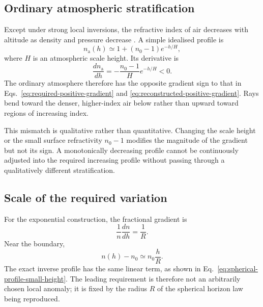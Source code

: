 \subsection{Ordinary atmospheric stratification}

Except under strong local inversions, the refractive index of air decreases
with altitude as density and pressure decrease
\cite{ciddor1996refractive,ussa1976,bean1966radio,itur2019p453}. A simple
idealised profile is
\begin{equation}
    n_{\mathrm{a}}(h)
    \simeq
    1+(n_0-1)e^{-h/H},
    \label{eq:ordinary-atmosphere-profile}
\end{equation}
where $H$ is an atmospheric scale height. Its derivative is
\begin{equation}
    \frac{dn_{\mathrm{a}}}{dh}
    =
    -\frac{n_0-1}{H}e^{-h/H}
    <0.
    \label{eq:ordinary-negative-gradient}
\end{equation}
The ordinary atmosphere therefore has the opposite gradient sign to that in
Eqs.~\eqref{eq:required-positive-gradient} and
\eqref{eq:reconstructed-positive-gradient}. Rays bend toward the denser,
higher-index air below rather than upward toward regions of increasing index.

This mismatch is qualitative rather than quantitative. Changing the
scale height or the small surface refractivity $n_0-1$ modifies the magnitude
of the gradient but not its sign. A monotonically decreasing profile cannot
be continuously adjusted into the required increasing profile without passing
through a qualitatively different stratification.

\subsection{Scale of the required variation}

For the exponential construction, the fractional gradient is
\begin{equation}
    \frac{1}{n}\frac{dn}{dh}
    =
    \frac{1}{R}.
    \label{eq:required-fractional-gradient}
\end{equation}
Near the boundary,
\begin{equation}
    n(h)-n_0
    \simeq
    n_0\frac{h}{R}.
    \label{eq:required-near-surface-index-change}
\end{equation}
The exact inverse profile has the same linear term, as shown in
Eq.~\eqref{eq:spherical-profile-small-height}. The leading requirement is
therefore not an arbitrarily chosen local anomaly; it is fixed by the radius
$R$ of the spherical horizon law being reproduced.

